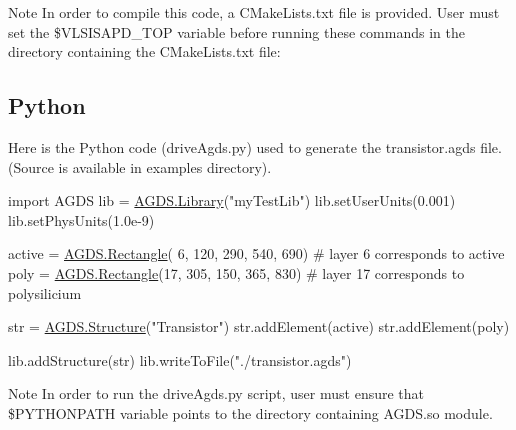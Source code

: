 \begin{DoxyNote}{Note}
In order to compile this code, a C\+Make\+Lists.\+txt file is provided. User must set the \$\+V\+L\+S\+I\+S\+A\+P\+D\+\_\+\+T\+OP variable before running these commands in the directory containing the C\+Make\+Lists.\+txt file\+: 
\begin{DoxyCode}
\end{DoxyCode}

\end{DoxyNote}
\hypertarget{agds_agdsPython}{}\subsection{Python}\label{agds_agdsPython}
Here is the Python code ({\ttfamily drive\+Agds.\+py}) used to generate the transistor.\+agds file. (Source is available in examples directory). 
\begin{DoxyCodeInclude}
\textcolor{keyword}{import} AGDS
lib = \mbox{\hyperlink{class_a_g_d_s_1_1_library}{AGDS.Library}}(\textcolor{stringliteral}{"myTestLib"})
lib.setUserUnits(0.001)
lib.setPhysUnits(1.0e-9)

active = \mbox{\hyperlink{class_a_g_d_s_1_1_rectangle}{AGDS.Rectangle}}( 6, 120, 290, 540, 690) \textcolor{comment}{# layer  6 corresponds to active}
poly   = \mbox{\hyperlink{class_a_g_d_s_1_1_rectangle}{AGDS.Rectangle}}(17, 305, 150, 365, 830) \textcolor{comment}{# layer 17 corresponds to polysilicium}

str = \mbox{\hyperlink{class_a_g_d_s_1_1_structure}{AGDS.Structure}}(\textcolor{stringliteral}{"Transistor"})
str.addElement(active)
str.addElement(poly)

lib.addStructure(str)
lib.writeToFile(\textcolor{stringliteral}{"./transistor.agds"})
\end{DoxyCodeInclude}


\begin{DoxyNote}{Note}
In order to run the {\ttfamily drive\+Agds.\+py} script, user must ensure that \$\+P\+Y\+T\+H\+O\+N\+P\+A\+TH variable points to the directory containing A\+G\+D\+S.\+so module. 
\end{DoxyNote}
